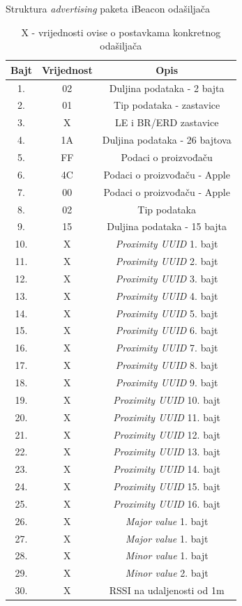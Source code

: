 \begin{table}[H]
	\centering
	\caption{Struktura \textit{advertising} paketa iBeacon odašiljača}
	\label{tbl:iBeacon}
	\small
	\begin{tabular}{*{3}{c}}
	\hline 
	Bajt & Vrijednost & Opis \\ 
	\hline 
	1. & 02 & Duljina podataka - 2 bajta \\ 
	2. & 01 & Tip podataka - zastavice \\ 
	3. & X & LE i BR/ERD zastavice \\ 
	4. & 1A & Duljina podataka - 26 bajtova \\ 
	5. & FF & Podaci o proizvođaču \\ 
	6. & 4C & Podaci o proizvođaču - Apple \\ 
	7. & 00 & Podaci o proizvođaču - Apple \\ 
	8. & 02 & Tip podataka \\ 
	9. & 15 & Duljina podataka - 15 bajta \\ 
	10. & X & \textit{Proximity UUID} 1. bajt \\ 
	11. & X & \textit{Proximity UUID} 2. bajt \\ 
	12. & X & \textit{Proximity UUID} 3. bajt \\ 
	13. & X & \textit{Proximity UUID} 4. bajt \\ 
	14. & X & \textit{Proximity UUID} 5. bajt \\ 
	15. & X & \textit{Proximity UUID} 6. bajt \\ 
	16. & X & \textit{Proximity UUID} 7. bajt \\ 
	17. & X & \textit{Proximity UUID} 8. bajt \\ 
	18. & X & \textit{Proximity UUID} 9. bajt \\ 
	19. & X & \textit{Proximity UUID} 10. bajt \\ 
	20. & X & \textit{Proximity UUID} 11. bajt \\ 
	21. & X & \textit{Proximity UUID} 12. bajt \\  
	22. & X & \textit{Proximity UUID} 13. bajt \\ 
	23. & X & \textit{Proximity UUID} 14. bajt \\  
	24. & X & \textit{Proximity UUID} 15. bajt \\ 
	25. & X & \textit{Proximity UUID} 16. bajt \\ 
	26. & X & \textit{Major value} 1. bajt \\ 
	27. & X & \textit{Major value} 1. bajt \\ 
	28. & X & \textit{Minor value} 1. bajt \\  
	29. & X & \textit{Minor value} 2. bajt \\ 
	30. & X & RSSI na udaljenosti od 1m \\ 
	\hline 
	\end{tabular}
	\caption*{X - vrijednosti ovise o postavkama konkretnog odašiljača}
\end{table}

